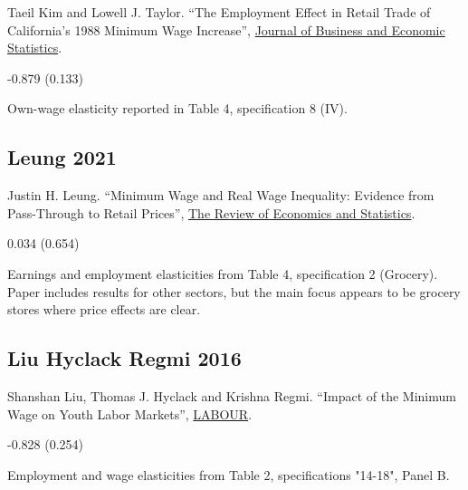 \noindent Taeil Kim and Lowell J. Taylor. ``The Employment Effect in Retail Trade of California’s 1988 Minimum Wage Increase'', \href{https://doi.org/10.1080/07350015.1995.10524591}{Journal of Business and Economic Statistics}.

\vspace{0.7em}

 -0.879 (0.133)

\vspace{0.7em}

 Own-wage elasticity reported in Table 4, specification 8 (IV).

\subsection*{Leung 2021}
\vspace{-0.7em}

\noindent Justin H. Leung. ``Minimum Wage and Real Wage Inequality: Evidence from Pass-Through to Retail Prices'', \href{https://doi.org/10.1162/rest_a_00915}{The Review of Economics and Statistics}.

\vspace{0.7em}

 0.034 (0.654)

\vspace{0.7em}

 Earnings and employment elasticities from Table 4, specification 2 (Grocery). Paper includes results for other sectors, but the main focus appears to be grocery stores where price effects are clear.

\subsection*{Liu Hyclack Regmi 2016}
\vspace{-0.7em}

\noindent Shanshan Liu, Thomas J. Hyclack and Krishna Regmi. ``Impact of the Minimum Wage on Youth Labor Markets'', \href{https://doi.org/10.1111/labr.12071}{LABOUR}.

\vspace{0.7em}

 -0.828 (0.254)

\vspace{0.7em}

 Employment and wage elasticities from Table 2, specifications "14-18", Panel B.

